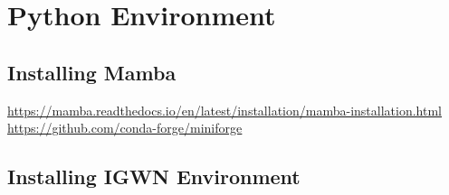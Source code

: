 \section{Python Environment}
\subsection{Installing Mamba}
\noindent \href{https://mamba.readthedocs.io/en/latest/installation/mamba-installation.html}{\color{blue}\underline{https://mamba.readthedocs.io/en/latest/installation/mamba-installation.html}}\\
\href{https://github.com/conda-forge/miniforge}{\color{blue}\underline{https://github.com/conda-forge/miniforge}}

\subsection{Installing IGWN Environment}

